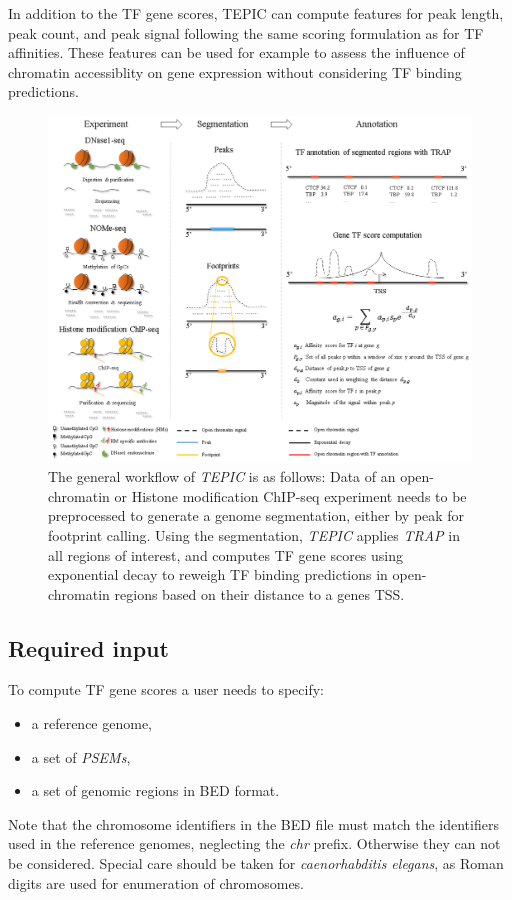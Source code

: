 \documentclass{article}
\begin{document}
In addition to the TF gene scores, TEPIC can compute features for peak length, peak count, and peak signal following the same scoring formulation as for
TF affinities. These features can be used for example to assess the influence of chromatin accessiblity on gene expression without considering TF binding
predictions. 
\begin{figure}[h!]
\begin{center}
\includegraphics[width=\textwidth]{Workflow.png}
\end{center}
\caption{The general workflow of \textit{TEPIC} is as follows: 
Data of an open-chromatin or Histone modification ChIP-seq experiment needs to be preprocessed to generate a genome segmentation, 
either by peak for footprint calling. 
Using the segmentation, \textit{TEPIC} applies \textit{TRAP} in all regions of interest, and computes TF gene scores using exponential decay to reweigh 
TF binding predictions in open-chromatin regions based on their distance to a genes TSS.} 
\label{workflowFig}
\end{figure}

\newpage
\subsection*{Required input}
To compute TF gene scores a user needs to specify:
\begin{itemize}
\item a reference genome,
\item a set of \textit{PSEMs},
\item a set of genomic regions in BED format.
\end{itemize}
Note that the chromosome identifiers in the BED file must match the identifiers used in the reference genomes, neglecting the \textit{chr} prefix. 
Otherwise they can not be considered. 
Special care should be taken for \textit{caenorhabditis elegans}, as Roman digits are used for enumeration of chromosomes.
\end{document}
